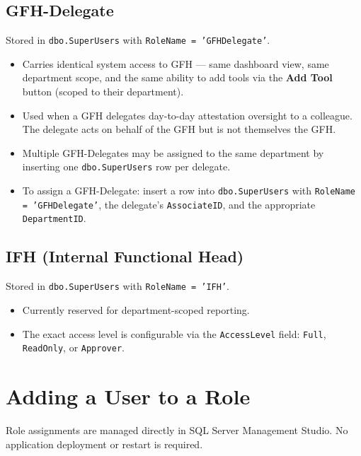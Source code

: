 \documentclass[12pt,a4paper]{report}
\begin{document}
\section{GFH-Delegate}

Stored in \texttt{dbo.SuperUsers} with \texttt{RoleName = 'GFHDelegate'}.

\begin{itemize}
  \item Carries identical system access to GFH --- same dashboard view, same department scope,
        and the same ability to add tools via the \textbf{Add Tool} button (scoped to their
        department).
  \item Used when a GFH delegates day-to-day attestation oversight to a colleague. The
        delegate acts on behalf of the GFH but is not themselves the GFH.
  \item Multiple GFH-Delegates may be assigned to the same department by inserting one
        \texttt{dbo.SuperUsers} row per delegate.
  \item To assign a GFH-Delegate: insert a row into \texttt{dbo.SuperUsers} with
        \texttt{RoleName = 'GFHDelegate'}, the delegate's \texttt{AssociateID}, and the
        appropriate \texttt{DepartmentID}.
\end{itemize}

\section{IFH (Internal Functional Head)}

Stored in \texttt{dbo.SuperUsers} with \texttt{RoleName = 'IFH'}.

\begin{itemize}
  \item Currently reserved for department-scoped reporting.
  \item The exact access level is configurable via the \texttt{AccessLevel} field:
        \texttt{Full}, \texttt{ReadOnly}, or \texttt{Approver}.
\end{itemize}

\chapter{Adding a User to a Role}

Role assignments are managed directly in SQL Server Management Studio. No application
deployment or restart is required.
\end{document}
